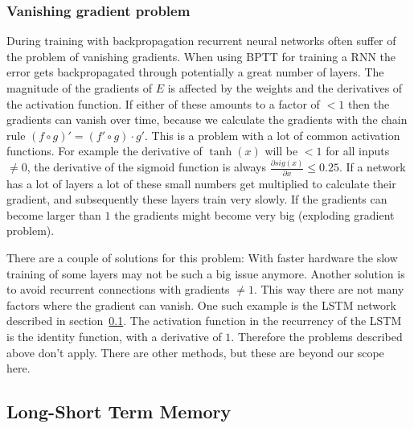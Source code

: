 \subsubsection{Vanishing gradient problem}

During training with backpropagation recurrent neural networks often suffer of the problem of vanishing gradients.
When using BPTT for training a RNN the error gets backpropagated through potentially a great number of layers. The magnitude
of the gradients of $E$ is affected by the weights and the derivatives of the activation function. If either of these amounts
to a factor of $< 1$ then the gradients can vanish over time, because we calculate the gradients with the
chain rule $(f\circ g)'=(f'\circ g)\cdot g'$.
This is a problem with a lot of common activation functions. For example the derivative 
of $\tanh(x)$ will be $< 1$ for all inputs $\neq 0$, 
the derivative of the sigmoid function is always $\frac{\partial sig(x)}{\partial x} \leq 0.25$. 
If a network has a lot of layers a lot of these small numbers get multiplied to calculate their gradient, and subsequently 
these layers train very slowly.
If the gradients can become larger than $1$ the gradients might become very big (exploding gradient problem).

There are a couple of solutions for this problem: With faster hardware the slow training of some layers may not be such a big issue anymore.
Another solution is to avoid recurrent connections with gradients $\neq 1$. This way there are not many factors where the
gradient can vanish. One such example is the LSTM network described in section~\ref{subsec:lstm}. 
The activation function in the recurrency of the LSTM is the identity function, with a derivative of $1$. Therefore the problems described 
above don't apply. There are other methods, but these are beyond our scope here.



\subsection{Long-Short Term Memory}
\label{subsec:lstm}

